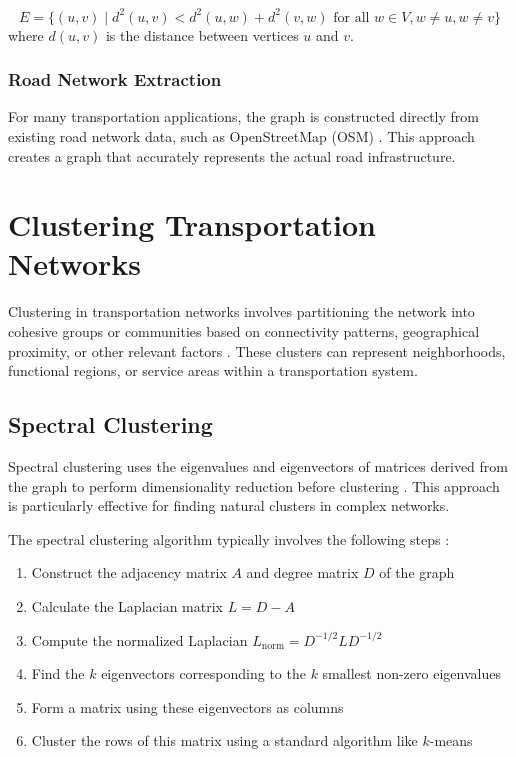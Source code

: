 \begin{equation}
    E = \{(u, v) \mid d^2(u, v) < d^2(u, w) + d^2(v, w) \text{ for all } w \in V, w \neq u, w \neq v\}
\end{equation}
where $d(u, v)$ is the distance between vertices $u$ and $v$.

\subsubsection{Road Network Extraction}
For many transportation applications, the graph is constructed directly from existing road network data, such as OpenStreetMap (OSM) \cite{haklay2008openstreetmap}. This approach creates a graph that accurately represents the actual road infrastructure.

\section{Clustering Transportation Networks}
\label{se:ClusteringMethods}

Clustering in transportation networks involves partitioning the network into cohesive groups or communities based on connectivity patterns, geographical proximity, or other relevant factors \cite{fortunato2010community}. These clusters can represent neighborhoods, functional regions, or service areas within a transportation system.

\subsection{Spectral Clustering}
\label{subsec:SpectralClustering}

Spectral clustering uses the eigenvalues and eigenvectors of matrices derived from the graph to perform dimensionality reduction before clustering \cite{von2007tutorial}. This approach is particularly effective for finding natural clusters in complex networks.

The spectral clustering algorithm typically involves the following steps \cite{ng2002spectral}:
\begin{enumerate}
    \item Construct the adjacency matrix $A$ and degree matrix $D$ of the graph
    \item Calculate the Laplacian matrix $L = D - A$
    \item Compute the normalized Laplacian $L_{\text{norm}} = D^{-1/2} L D^{-1/2}$
    \item Find the $k$ eigenvectors corresponding to the $k$ smallest non-zero eigenvalues
    \item Form a matrix using these eigenvectors as columns
    \item Cluster the rows of this matrix using a standard algorithm like $k$-means
\end{enumerate}

